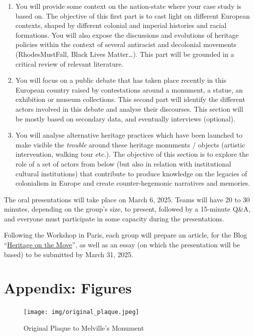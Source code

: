 \documentclass{scrartcl}
\begin{document}
\begin{appendices}
\begin{enumerate}
    \item You will provide some context on the nation-state where your case study is based on. The objective of this first part is to cast light on different European contexts, shaped by different colonial and imperial histories and racial formations. You will also expose the discussions and evolutions of heritage policies within the context of several antiracist and decolonial movements (RhodesMustFall, Black Lives Matter…). This part will be grounded in a critical review of relevant literature.
    \item You will focus on a public debate that has taken place recently in this European country raised by contestations around a monument, a statue, an exhibition or museum collections. This second part will identify the different actors involved in this debate and analyse their discourses. This section will be mostly based on secondary data, and eventually interviews (optional).
    \item  You will analyse alternative heritage practices which have been launched to make visible the \textit{trouble} around these heritage monuments / objects (artistic intervention, walking tour etc.). The objective of this section is to explore the role of a set of actors from below (but also in relation with institutional cultural institutions) that contribute to produce knowledge on the legacies of colonialism in Europe and create counter-hegemonic narratives and memories. 
\end{enumerate}

 The oral presentations will take place on March 6, 2025. Teams will have 20 to 30 minutes, depending on the group’s size, to present, followed by a 15-minute Q\&A, and everyone must participate in some capacity during the presentations.

Following the Workshop in Paris, each group will prepare an article, for the Blog “\href{https://herblog.hypotheses.org/}{Heritage on the Move}”, as well as an essay (on which the presentation will be based) to be submitted by March 31, 2025.


\section{Appendix: Figures}\label{sec:figure}

\begin{figure}
    \centering
    \texttt{[image: img/original\_plaque.jpeg]}
    \caption{Original Plaque to Melville's Monument}
    \label{fig:original_plaque}
\end{figure}


\end{appendices}
\end{document}
